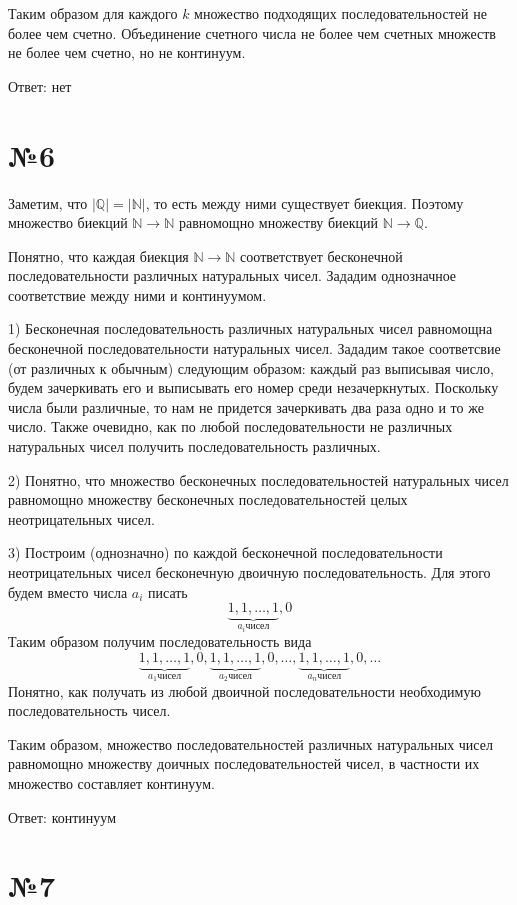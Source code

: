 \documentclass[12pt]{article}
\begin{document}
	Таким образом для каждого $k$ множество подходящих последовательностей не более чем счетно. Объединение счетного числа не более чем счетных множеств не более чем счетно, но не континуум.
	
	Ответ: нет
		
	\section*{№6}
	Заметим, что $|\mathbb{Q}|=|\mathbb{N}|$, то есть между ними существует биекция. Поэтому множество биекций $\mathbb{N} \to \mathbb{N}$ равномощно множеству биекций  $\mathbb{N} \to \mathbb{Q}$.
	
	Понятно, что каждая биекция $\mathbb{N} \to \mathbb{N}$ соответствует бесконечной последовательности различных натуральных чисел.
	Зададим однозначное соответствие между ними и континуумом.
	
	1) Бесконечная последовательность различных натуральных чисел равномощна бесконечной последовательности натуральных чисел. Зададим такое соответсвие (от различных к обычным) следующим образом: каждый раз выписывая число, будем зачеркивать его и выписывать его номер среди незачеркнутых. Поскольку числа были различные, то нам не придется зачеркивать два раза одно и то же число. Также очевидно, как по любой последовательности не различных натуральных чисел получить последовательность различных.
	
	2) Понятно, что множество бесконечных последовательностей натуральных чисел равномощно множеству бесконечных последовательностей целых неотрицательных чисел.
	
	3) Построим (однозначно) по каждой бесконечной последовательности неотрицательных чисел бесконечную двоичную последовательность. Для этого будем вместо числа $a_i$ писать 
	$$\underbrace{{1, 1, \dots, 1}}_{a_i чисел}, 0$$
	Таким образом получим последовательность вида
	$$\underbrace{{1, 1, \dots, 1}}_{a_1 чисел}, 0, 
	  \underbrace{{1, 1, \dots, 1}}_{a_2 чисел}, 0, 
	  \dots, 
	  \underbrace{{1, 1, \dots, 1}}_{a_n чисел}, 0, 
	  \dots
	  $$
	Понятно, как получать из любой двоичной последовательности необходимую последовательность чисел.
	
	Таким образом, множество последовательностей различных натуральных чисел равномощно множеству доичных последовательностей чисел, в частности их множество составляет континуум.
	
	Ответ: континуум
	
	\section*{№7}
	
\end{document}
